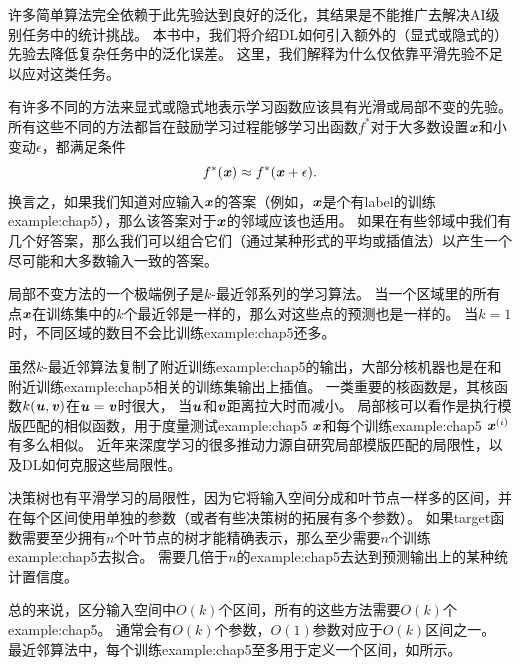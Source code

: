 许多简单算法完全依赖于此先验达到良好的泛化，其结果是不能推广去解决\gls{AI}级别任务中的统计挑战。
本书中，我们将介绍\gls{DL}如何引入额外的（显式或隐式的）先验去降低复杂任务中的泛化误差。
这里，我们解释为什么仅依靠平滑先验不足以应对这类任务。

有许多不同的方法来显式或隐式地表示学习函数应该具有光滑或局部不变的先验。
所有这些不同的方法都旨在鼓励学习过程能够学习出函数$f^*$对于大多数设置$\boldsymbol{\mathit{x}}$和小变动$\epsilon$，都满足条件
\begin{equation}
    f^*(\boldsymbol{\mathit{x}}) \approx f^*(\boldsymbol{\mathit{x}} + \epsilon).
\end{equation}
换言之，如果我们知道对应输入$\boldsymbol{\mathit{x}}$的答案（例如，$\boldsymbol{\mathit{x}}$是个有\gls{label}的训练\gls{example:chap5}），那么该答案对于$\boldsymbol{\mathit{x}}$的邻域应该也适用。
如果在有些邻域中我们有几个好答案，那么我们可以组合它们（通过某种形式的平均或插值法）以产生一个尽可能和大多数输入一致的答案。

局部不变方法的一个极端例子是$k$-最近邻系列的学习算法。
当一个区域里的所有点$\boldsymbol{\mathit{x}}$在训练集中的$k$个最近邻是一样的，那么对这些点的预测也是一样的。
当$k=1$时，不同区域的数目不会比训练\gls{example:chap5}还多。

虽然$k$-最近邻算法复制了附近训练\gls{example:chap5}的输出，大部分核机器也是在和附近训练\gls{example:chap5}相关的训练集输出上插值。
一类重要的核函数是，其核函数$k(\boldsymbol{\mathit{u}},\boldsymbol{\mathit{v}})$在$\boldsymbol{\mathit{u}}=\boldsymbol{\mathit{v}}$时很大，
当$\boldsymbol{\mathit{u}}$和$\boldsymbol{\mathit{v}}$距离拉大时而减小。
局部核可以看作是执行模版匹配的相似函数，用于度量测试\gls{example:chap5} $\boldsymbol{\mathit{x}}$和每个训练\gls{example:chap5} $\boldsymbol{\mathit{x}}^{(i)}$有多么相似。
近年来深度学习的很多推动力源自研究局部模版匹配的局限性，以及\gls{DL}如何克服这些局限性\citep{Bengio-localfailure-NIPS-2006-small}。

决策树也有平滑学习的局限性，因为它将输入空间分成和叶节点一样多的区间，并在每个区间使用单独的参数（或者有些决策树的拓展有多个参数）。
如果\gls{target}函数需要至少拥有$n$个叶节点的树才能精确表示，那么至少需要$n$个训练\gls{example:chap5}去拟合。
需要几倍于$n$的\gls{example:chap5}去达到预测输出上的某种统计置信度。


总的来说，区分输入空间中$O(k)$个区间，所有的这些方法需要$O(k)$个\gls{example:chap5}。
通常会有$O(k)$个参数，$O(1)$参数对应于$O(k)$区间之一。
最近邻算法中，每个训练\gls{example:chap5}至多用于定义一个区间，如所示。


